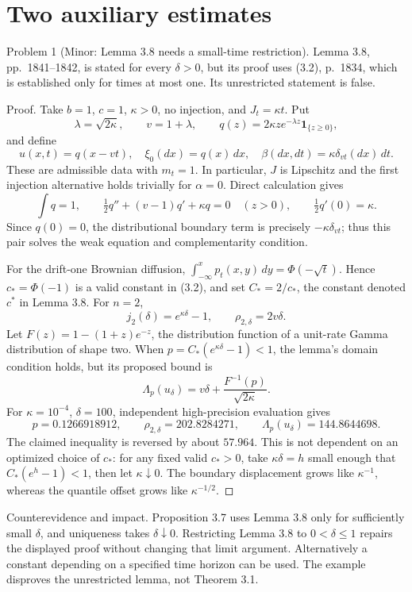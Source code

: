 \documentclass[10pt]{article}
\begin{document}
\section*{Two auxiliary estimates}
Problem 1 (Minor: Lemma 3.8 needs a small-time restriction).  Lemma 3.8, pp. 1841–1842, is stated for every \(\delta>0\), but its proof uses (3.2), p. 1834, which is established only for times at most one. Its unrestricted statement is false.\par
Proof. Take \(b=1\), \(c=1\), \(\kappa>0\), no injection, and \(J_t=\kappa t\). Put \[\lambda=\sqrt{2\kappa},\qquad v=1+\lambda,\qquad
q(z)=2\kappa z e^{-\lambda z}\mathbf1_{\{z\geq0\}},\] and define \[u(x,t)=q(x-vt),\quad \xi_0(dx)=q(x)\,dx,\quad
\beta(dx,dt)=\kappa\delta_{vt}(dx)\,dt.\] These are admissible data with \(m_t=1\). In particular, \(J\) is Lipschitz and the first injection alternative holds trivially for \(\alpha=0\). Direct calculation gives \[\int q=1,\qquad
\tfrac12q''+(v-1)q'+\kappa q=0\quad(z>0),\qquad
\tfrac12q'(0)=\kappa.\] Since \(q(0)=0\), the distributional boundary term is precisely \(-\kappa\delta_{vt}\); thus this pair solves the weak equation and complementarity condition.\par
For the drift-one Brownian diffusion, \(\int_{-\infty}^x p_t(x,y)\,dy=\Phi(-\sqrt t)\). Hence \(c_*=\Phi(-1)\) is a valid constant in (3.2), and set \(C_*=2/c_*\), the constant denoted \(c^*\) in Lemma 3.8. For \(n=2\), \[j_2(\delta)=e^{\kappa\delta}-1,\qquad
\rho_{2,\delta}=2v\delta.\] Let \(F(z)=1-(1+z)e^{-z}\), the distribution function of a unit-rate Gamma distribution of shape two. When \(p=C_*(e^{\kappa\delta}-1)<1\), the lemma’s domain condition holds, but its proposed bound is \[\Lambda_p(u_\delta)=v\delta+\frac{F^{-1}(p)}{\sqrt{2\kappa}}.\] For \(\kappa=10^{-4}\), \(\delta=100\), independent high-precision evaluation gives \[p=0.1266918912,\qquad
\rho_{2,\delta}=202.8284271,\qquad
\Lambda_p(u_\delta)=144.8644698.\] The claimed inequality is reversed by about \(57.964\). This is not dependent on an optimized choice of \(c_*\): for any fixed valid \(c_*>0\), take \(\kappa\delta=h\) small enough that \(C_*(e^h-1)<1\), then let \(\kappa\downarrow0\). The boundary displacement grows like \(\kappa^{-1}\), whereas the quantile offset grows like \(\kappa^{-1/2}\). ◻\par
Counterevidence and impact. Proposition 3.7 uses Lemma 3.8 only for sufficiently small \(\delta\), and uniqueness takes \(\delta\downarrow0\). Restricting Lemma 3.8 to \(0<\delta\leq1\) repairs the displayed proof without changing that limit argument. Alternatively a constant depending on a specified time horizon can be used. The example disproves the unrestricted lemma, not Theorem 3.1.\par
\end{document}
